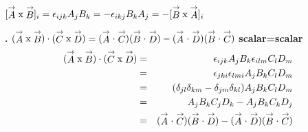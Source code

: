{ $[ \stackrel{\rightarrow}{A} \textup{x} \stackrel{\rightarrow}{B}]_i=
 \epsilon_{ijk}A_jB_k= - \epsilon_{ikj}B_kA_j = -[ \stackrel{\rightarrow}{B} \textup{x} \stackrel{\rightarrow}{A}]_i$
\vspace{.1in}

{\bf {}.} $(\stackrel{\rightarrow}{A} \textup{x} \stackrel{\rightarrow}{B})\cdot (\stackrel{\rightarrow}{C} \textup{x} \stackrel{\rightarrow}{D})=(\stackrel{\rightarrow}{A} \cdot \stackrel{\rightarrow}{C})(\stackrel{\rightarrow}{B} \cdot \stackrel{\rightarrow}{D} ) -
(\stackrel{\rightarrow}{A} \cdot \stackrel{\rightarrow}{D})(\stackrel{\rightarrow}{B} \cdot \stackrel{\rightarrow}{C} )$
{\flushleft \bf scalar=scalar}
\begin{eqnarray*}
(\stackrel{\rightarrow}{A} \textup{x} \stackrel{\rightarrow}{B})
\cdot (\stackrel{\rightarrow}{C} \textup{x} \stackrel{\rightarrow}{D})&=&
\epsilon_{ijk}A_jB_k\epsilon_{ilm}C_lD_m\\
&=&\epsilon_{jki}\epsilon_{lmi}A_jB_kC_lD_m\\
&=&(\delta_{jl}\delta_{km}-\delta_{jm}\delta_{kl})A_jB_kC_lD_m\\
&=&A_jB_kC_jD_k-A_jB_kC_kD_j\\
&=&(\stackrel{\rightarrow}{A} \cdot \stackrel{\rightarrow}{C})(\stackrel{\rightarrow}{B} \cdot \stackrel{\rightarrow}{D} ) -
(\stackrel{\rightarrow}{A} \cdot \stackrel{\rightarrow}{D})(\stackrel{\rightarrow}{B} \cdot \stackrel{\rightarrow}{C} )
\end{eqnarray*}

}
